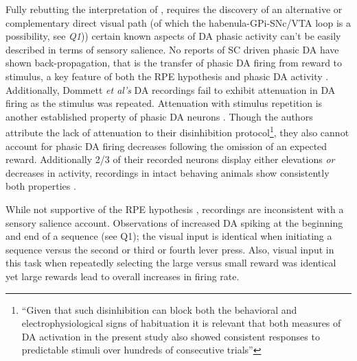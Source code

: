 \documentclass[doc]{apa}        %
\begin{document}
Fully rebutting the interpretation of ,  requires the discovery of an alternative or complementary direct visual path (of which the habenula-GPi-SNc/VTA loop is a possibility, see \emph{Q1})) certain known aspects of DA phasic activity can't be easily described in terms of sensory salience.  No reports of SC driven phasic DA have shown back-propagation, that is the transfer of phasic DA firing from reward to stimulus, a key feature of both the RPE hypothesis and phasic DA activity \cite{ODoherty:2003p6329,seymour:2004aa}.  Additionally, Dommett \emph{et al's} DA recordings fail to exhibit attenuation in DA firing as the stimulus was repeated.  Attenuation with stimulus repetition is another established property of phasic DA neurons \cite{Mirenowicz:1994p7185}.  Though the authors attribute the lack of attenuation to their disinhibition protocol\footnote{``Given that such disinhibition can block both the behavioral and electrophysiological signs of habituation it is relevant that both measures of DA activation in the present study also showed consistent responses to predictable stimuli over hundreds of consecutive trials''}, they also cannot account for phasic DA firing decreases following the omission of an expected reward. Additionally 2/3 of their recorded neurons display either elevations \emph{or} decreases in activity, recordings in intact behaving animals show consistently both properties \cite{Bayer:2007p862}.

While not supportive of the RPE hypothesis , recordings are inconsistent with a sensory salience account.  Observations of increased DA spiking at the beginning and end of a sequence (see Q1); the visual input is identical when initiating a sequence versus the second or third or fourth lever press.  Also, visual input in this task when repeatedly selecting the large versus small reward was identical yet large rewards lead to overall increases in firing rate. 
\end{document}
